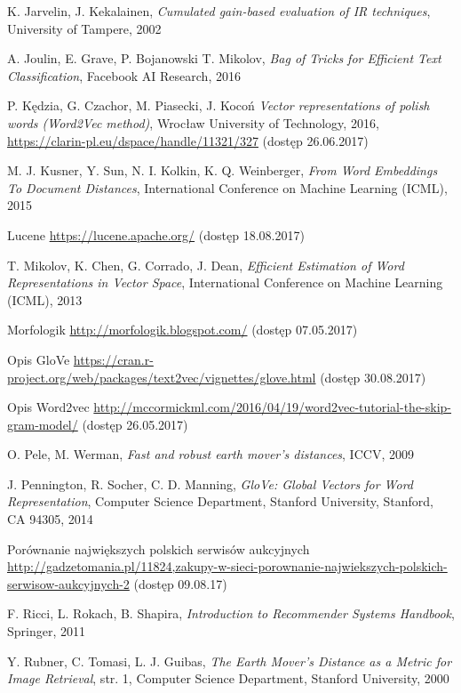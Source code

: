 \documentclass[pl]{minipw} %
\begin{document}
\begin{thebibliography}{30}
		K. Jarvelin, J. Kekalainen,
		\emph{Cumulated gain-based evaluation of IR techniques},
		University of Tampere,
		2002
	
		A. Joulin, E. Grave, P. Bojanowski T. Mikolov,
		\emph{Bag of Tricks for Efficient Text Classification},
		Facebook AI Research,
		2016
	
		P. Kędzia, G. Czachor, M. Piasecki, J. Kocoń
		\emph{Vector representations of polish words (Word2Vec method)},
		Wrocław University of Technology,
		2016,
		\url{https://clarin-pl.eu/dspace/handle/11321/327}
		(dostęp 26.06.2017)
	
		M. J. Kusner, Y. Sun, N. I. Kolkin, K. Q. Weinberger,
		\emph{From Word Embeddings To Document Distances},
		International Conference on Machine Learning (ICML),
		2015
	
		Lucene
		\url{https://lucene.apache.org/}
		(dostęp 18.08.2017)
	
		T. Mikolov, K. Chen, G. Corrado, J. Dean,
		\emph{Efficient Estimation of Word Representations in Vector Space},
		International Conference on Machine Learning (ICML),
		2013
	
		Morfologik
		\url{http://morfologik.blogspot.com/}
		(dostęp 07.05.2017)
	
		Opis GloVe
		\url{https://cran.r-project.org/web/packages/text2vec/vignettes/glove.html}
		(dostęp 30.08.2017)
	
		Opis Word2vec
		\url{http://mccormickml.com/2016/04/19/word2vec-tutorial-the-skip-gram-model/}
		(dostęp 26.05.2017)
	
		O. Pele, M. Werman,
		\emph{Fast and robust earth mover's distances},
		ICCV,
		2009
	
		J. Pennington, R. Socher, C. D. Manning,
		\emph{GloVe: Global Vectors for Word Representation},
		Computer Science Department, Stanford University, Stanford, CA 94305,
		2014
	
		Porównanie największych polskich serwisów aukcyjnych
		\url{http://gadzetomania.pl/11824,zakupy-w-sieci-porownanie-najwiekszych-polskich-serwisow-aukcyjnych-2}
		(dostęp 09.08.17)
	
		F. Ricci, L. Rokach, B. Shapira,
		\emph{Introduction to Recommender Systems Handbook},
		Springer,
		2011
	
		Y. Rubner, C. Tomasi, L. J. Guibas,
		\emph{The Earth Mover's Distance as a Metric for Image Retrieval},
		str. 1,
		Computer Science Department, Stanford University,
		2000	


\end{thebibliography}
\end{document}
